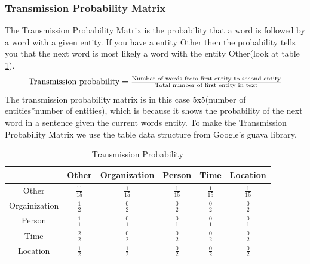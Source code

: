 \documentclass{article}
\begin{document}
\subsubsection{Transmission Probability Matrix }
The Transmission Probability Matrix is the probability that a word is followed by a word with a given entity. If you have a entity Other then the probability tells you that the next word is most likely a word with the entity Other(look at table \ref{tab:Transmissionprobability}).
\begin{equation}
\resizebox{.9\textwidth}{!}{
$
\text{Transmission probability} = \frac{\text{Number of words from first entity to  second entity}}{\text{Total number of first entity in text}}
$
}
\end{equation}
The transmission probability matrix is in this case 5x5(number of entities*number of entities), which is because it shows the probability of the next word in a sentence given the current words entity.
To make the Transmission Probability Matrix we use the table data structure from Google's guava library.
\begin{table}[here]
\centering
\begin{tabular}{|c|c|c|c|c|c|}
\hline
& Other & Organization & Person & Time & Location\\
\hline
Other & $\frac{11}{15}$ & $\frac{1}{15}$ & $\frac{1}{15}$ & $\frac{1}{15}$ & $\frac{1}{15}$ \\
\hline
Orgainization & $\frac{1}{2}$ & $\frac{0}{2}$ & $\frac{0}{2}$ & $\frac{0}{2}$ & $\frac{0}{2}$ \\
\hline
Person & $\frac{1}{1}$ & $\frac{0}{1}$ & $\frac{0}{1}$ & $\frac{0}{1}$ & $\frac{0}{1}$ \\
\hline
Time & $\frac{2}{2}$ & $\frac{0}{2}$ & $\frac{0}{2}$ & $\frac{0}{2}$ & $\frac{0}{2}$ \\
\hline
Location & $\frac{1}{2}$ & $\frac{1}{2}$ & $\frac{0}{2}$ & $\frac{0}{2}$ & $\frac{0}{2}$ \\
\hline
\end{tabular}
\caption{Transmission Probability}
\label{tab:Transmissionprobability}
\end{table}
\clearpage
\end{document}
